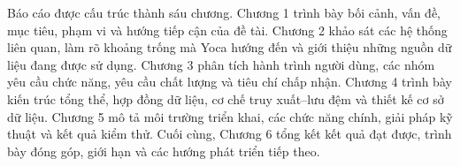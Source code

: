 Báo cáo được cấu trúc thành sáu chương. Chương 1 trình bày bối cảnh, vấn đề, mục tiêu, phạm vi và hướng tiếp cận của đề tài. Chương 2 khảo sát các hệ thống liên quan, làm rõ khoảng trống mà Yoca hướng đến và giới thiệu những nguồn dữ liệu đang được sử dụng. Chương 3 phân tích hành trình người dùng, các nhóm yêu cầu chức năng, yêu cầu chất lượng và tiêu chí chấp nhận. Chương 4 trình bày kiến trúc tổng thể, hợp đồng dữ liệu, cơ chế truy xuất--lưu đệm và thiết kế cơ sở dữ liệu. Chương 5 mô tả môi trường triển khai, các chức năng chính, giải pháp kỹ thuật và kết quả kiểm thử. Cuối cùng, Chương 6 tổng kết kết quả đạt được, trình bày đóng góp, giới hạn và các hướng phát triển tiếp theo.
